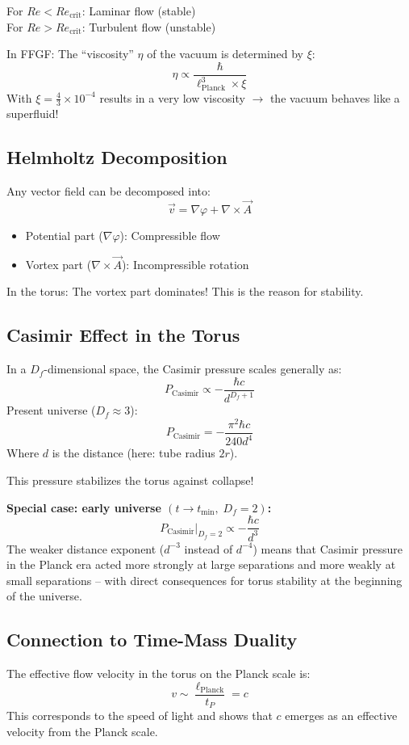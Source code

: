 For \( Re < Re_{\text{crit}} \): Laminar flow (stable) \\
For \( Re > Re_{\text{crit}} \): Turbulent flow (unstable)

In FFGF:
The ``viscosity'' \( \eta \) of the vacuum is determined by \( \xi \):
\[
\eta \propto \frac{\hbar}{\ell_{\text{Planck}}^3 \times \xi}
\]
With \( \xi = \frac{4}{3} \times 10^{-4} \) results in a very low viscosity \( \rightarrow \) the vacuum behaves like a superfluid!

\subsection{Helmholtz Decomposition}
Any vector field can be decomposed into:
\[
\vec{v} = \nabla \varphi + \nabla \times \vec{A}
\]
\begin{itemize}
	\item Potential part (\( \nabla \varphi \)): Compressible flow
	\item Vortex part (\( \nabla \times \vec{A} \)): Incompressible rotation
\end{itemize}

In the torus: The vortex part dominates! This is the reason for stability.

\subsection{Casimir Effect in the Torus}
In a \(D_f\)-dimensional space, the Casimir pressure scales generally as:
\[
P_{\text{Casimir}} \propto -\frac{\hbar c}{d^{D_f+1}}
\]
Present universe (\( D_f \approx 3 \)):
\[
P_{\text{Casimir}} = -\frac{\pi^2 \hbar c}{240 d^4}
\]
Where \( d \) is the distance (here: tube radius \( 2r \)).

This pressure stabilizes the torus against collapse!

\textbf{Special case: early universe \((t \to t_{\min},\; D_f = 2)\):}
\[
P_{\text{Casimir}}\big|_{D_f=2} \propto -\frac{\hbar c}{d^3}
\]
The weaker distance exponent ($d^{-3}$ instead of $d^{-4}$) means that Casimir pressure in the Planck era acted more strongly at large separations and more weakly at small separations -- with direct consequences for torus stability at the beginning of the universe.

\subsection{Connection to Time-Mass Duality}
The effective flow velocity in the torus on the Planck scale is:
\[
v \sim \frac{\ell_{\text{Planck}}}{t_P} = c
\]
This corresponds to the speed of light and shows that \( c \) emerges as an effective velocity from the Planck scale.

